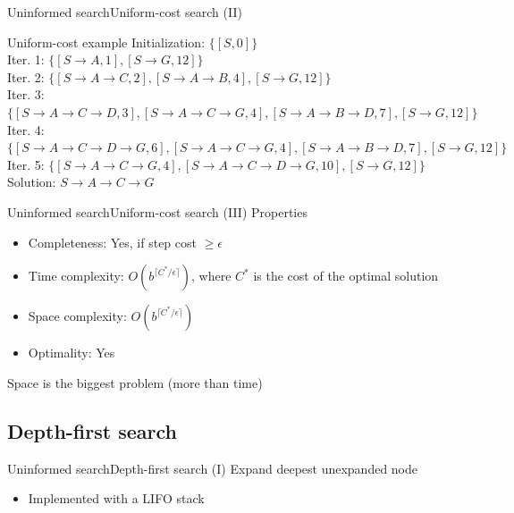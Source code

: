 \documentclass[10pt,compress]{beamer} %
\begin{document}
\begin{frame}[fragile]{Uninformed search}{Uniform-cost search (II)}
    \begin{exampleblock}{Uniform-cost example}
    \small{
    Initialization: $\{[S, 0]\}$\\
    Iter. 1: $\{[S \rightarrow A, 1], [S \rightarrow G, 12]\}$\\
    Iter. 2: $\{[S \rightarrow A \rightarrow C, 2], [S \rightarrow A \rightarrow B, 4], [S \rightarrow G, 12]\}$\\
    Iter. 3: $\{[S \rightarrow A \rightarrow C \rightarrow D, 3], [S \rightarrow A \rightarrow C \rightarrow G, 4], [S \rightarrow A \rightarrow B \rightarrow D, 7], [S \rightarrow G, 12]\}$\\
    Iter. 4: $\{[S \rightarrow A \rightarrow C \rightarrow D \rightarrow G, 6], [S \rightarrow A \rightarrow C \rightarrow G, 4], [S \rightarrow A \rightarrow B \rightarrow D, 7], [S \rightarrow G, 12]\}$\\
    Iter. 5: $\{[S \rightarrow A \rightarrow C \rightarrow G, 4], [S \rightarrow A \rightarrow C \rightarrow D \rightarrow G, 10], [S \rightarrow G, 12]\}$\\
    Solution: $S \rightarrow A \rightarrow C \rightarrow G$\\
    }
    \end{exampleblock}
\end{frame}

\begin{frame}[fragile]{Uninformed search}{Uniform-cost search (III)}
      Properties
      \begin{itemize}
        \item Completeness: Yes, if step cost $\ge\epsilon$
        \item Time complexity: $O(b^{\lceil C^{*}/\epsilon \rceil})$, where $C^{*}$ is the cost of the optimal solution
        \item Space complexity: $O(b^{\lceil C^{*}/\epsilon \rceil})$
        \item Optimality: Yes
      \end{itemize}
      Space is the biggest problem (more than time)
\end{frame}

\subsection{Depth-first search}

\begin{frame}{Uninformed search}{Depth-first search (I)}
    Expand deepest unexpanded node
    \begin{itemize}
        \item Implemented with a LIFO stack
    \end{itemize}
\end{frame}
\end{document}
